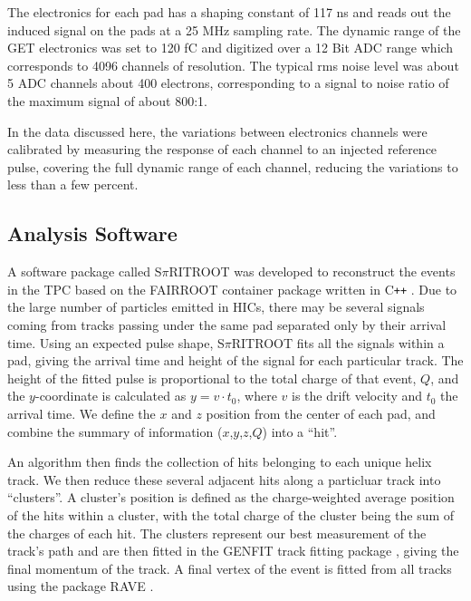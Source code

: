 \documentclass[review]{elsarticle}
\begin{document}
The electronics for each pad has a shaping constant of 117 ns and reads out the induced signal on the pads at a 25 MHz sampling rate. The dynamic range of the GET electronics was set to 120 fC and digitized over a 12 Bit ADC range which corresponds to 4096 channels of resolution. The typical rms noise level was about 5 ADC channels about 400 electrons, corresponding to a signal to noise ratio of the maximum signal of about 800:1. 

In the data discussed here, the variations between electronics channels were calibrated by measuring the response of each channel to an injected reference pulse, covering the full dynamic range of each channel, reducing the variations to less than a few percent.
 
\subsection{Analysis Software}
A software package called S$\pi$RITROOT was developed to reconstruct the events in the TPC based on the FAIRROOT container package written in C\texttt{++} \cite{fairroot}. Due to the large number of particles emitted in HICs, there may be several signals coming from tracks passing under the same pad separated only by their arrival time. Using an expected pulse shape, S$\pi$RITROOT fits all the signals within a pad, giving the arrival time and height of the signal for each particular track. The height of the fitted pulse is proportional to the total charge of that event, $Q$, and the $y$-coordinate is calculated as $y = v\cdot t_0$, where $v$ is the drift velocity and $t_0$ the arrival time. We define the $x$ and $z$ position from the center of each pad, and combine the summary of information ($x$,$y$,$z$,$Q$) into a ``hit''. 

 An algorithm then finds the collection of hits belonging to each unique helix track. We then reduce these several adjacent hits along a particluar track into ``clusters''. A cluster's position is defined as the charge-weighted average position of the hits within a cluster, with the total charge of the cluster being the sum of the charges of each hit. The clusters represent our best measurement of the track's path and are then fitted in the GENFIT track fitting package \cite{genfit}, giving the final momentum of the track. A final vertex of the event is fitted from all tracks using the package RAVE \cite{rave}. 
 
\end{document}
